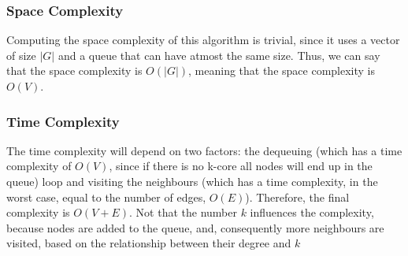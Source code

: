 \subsubsection{Space Complexity}

Computing the space complexity of this algorithm is trivial, since it uses a vector of size $|G|$ and a queue that can have atmost the same size. Thus, we can say that the space complexity is $O(|G|)$, meaning that the space complexity is $O(V)$.

\subsubsection{Time Complexity}

The time complexity will depend on two factors: the dequeuing (which has a time complexity of $O(V)$, since if there is no k-core all nodes will end up in the queue) loop and visiting the neighbours (which has a time complexity, in the worst case, equal to the number of edges, $O(E)$). Therefore, the final complexity is $O(V + E)$. Not that the number $k$ influences the complexity, because nodes are added to the queue, and, consequently more neighbours are visited, based on the relationship between their degree and $k$